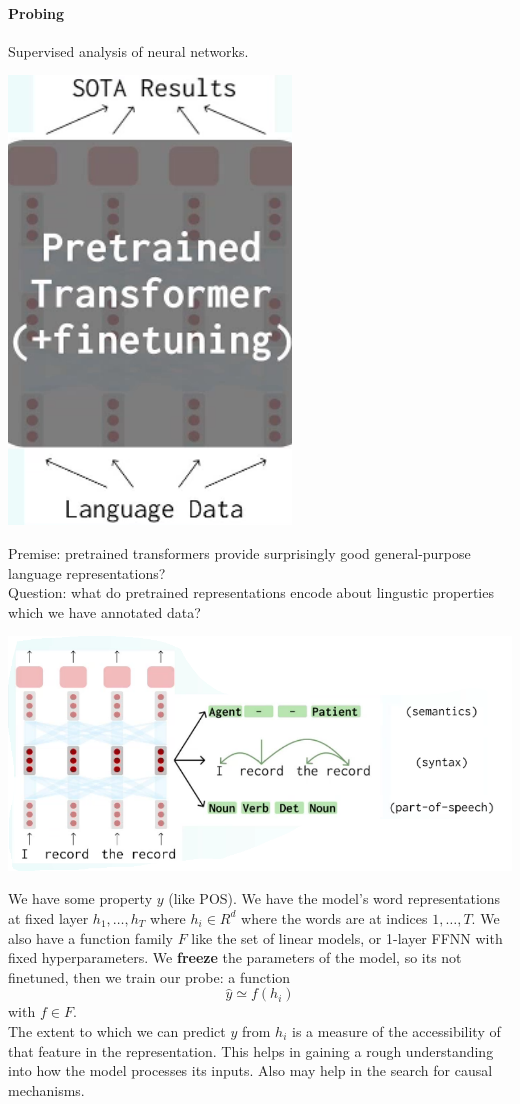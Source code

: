 \documentclass[10pt]{report}
\begin{document}
\paragraph{Probing} Supervised analysis of neural networks.
\begin{center}
	\includegraphics[scale=0.5]{80.png}
\end{center}
Premise: pretrained transformers provide surprisingly good general-purpose language representations?\\
Question: what do pretrained representations encode about lingustic properties which we have annotated data?
\begin{center}
	\includegraphics[scale=0.5]{81.png}
\end{center}
We have some property $y$ (like POS). We have the model's word representations at fixed layer $h_1,\ldots,h_T$ where $h_i\in R^d$ where the words are at indices $1,\ldots,T$. We also have a function family $F$ like the set of linear models, or 1-layer FFNN with fixed hyperparameters. We \textbf{freeze} the  parameters of the model, so its not finetuned, then we train our probe: a function $$\hat{y}\simeq f(h_i)$$ with $f\in F$.\\
The extent to which we can predict $y$ from $h_i$ is a measure of the accessibility of that feature in the representation. This helps in gaining a rough understanding into how the model processes its inputs. Also may help in the search for causal mechanisms.
\end{document}
